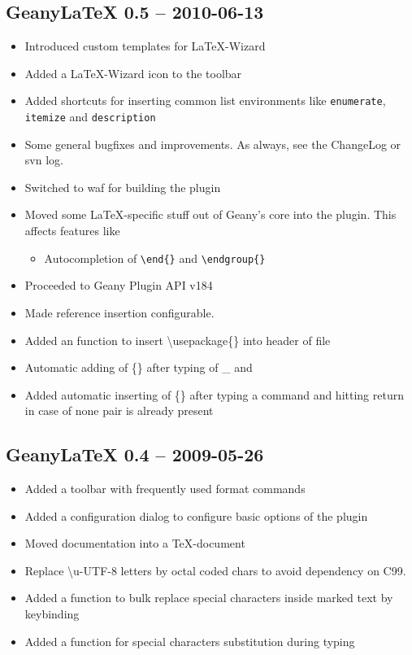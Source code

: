 \documentclass[%
paper=a4,%
fontsize=11pt,%
twoside=false,%
DIV18,%
headsepline,%
plainheadsepline,%
footsepline,%
plainfootsepline,%
bibliography=totoc,%
listof=totoc,%
BCOR10mm,%
parskip=half,%
openany,%
]{scrartcl}
\begin{document}
\subsection{Geany\LaTeX{} 0.5 -- 2010-06-13}
\begin{itemize}
	\item Introduced custom templates for \LaTeX-Wizard
	\item Added a \LaTeX-Wizard icon to the toolbar
	\item Added shortcuts for inserting common list environments
		  like \texttt{enumerate}, \texttt{itemize} and
		  \texttt{description}
	\item Some general bugfixes and improvements. As always, see the
		  ChangeLog or svn log.
	\item Switched to waf for building the plugin
	\item Moved some \LaTeX{}-specific stuff out of Geany's core into the
		  plugin. This affects features like
			\begin{itemize}
				\item Autocompletion of \texttt{\textbackslash{}end\{\}}
					and \texttt{\textbackslash{}endgroup\{\}}
			\end{itemize}
	\item Proceeded to Geany Plugin API v184
	\item Made reference insertion configurable.
	\item Added an function to insert \textbackslash{}usepackage\{\} into
		  header of file
	\item Automatic adding of \{\} after typing of \_{} and 
	\item Added automatic inserting of \{\} after typing a command and
		  hitting return in case of none pair is already present
\end{itemize}

\subsection{Geany\LaTeX{} 0.4 -- 2009-05-26}
\begin{itemize}
	\item Added a toolbar with frequently used format commands
	\item Added a configuration dialog to configure basic options
          of the plugin
	\item Moved documentation into a \TeX{}-document
	\item Replace \textbackslash{}u-UTF-8 letters by octal coded
          chars to avoid dependency on C99.
	\item Added a function to bulk replace special characters
          inside marked text by keybinding
	\item Added a function for special characters substitution during typing
\end{itemize}
\end{document}
